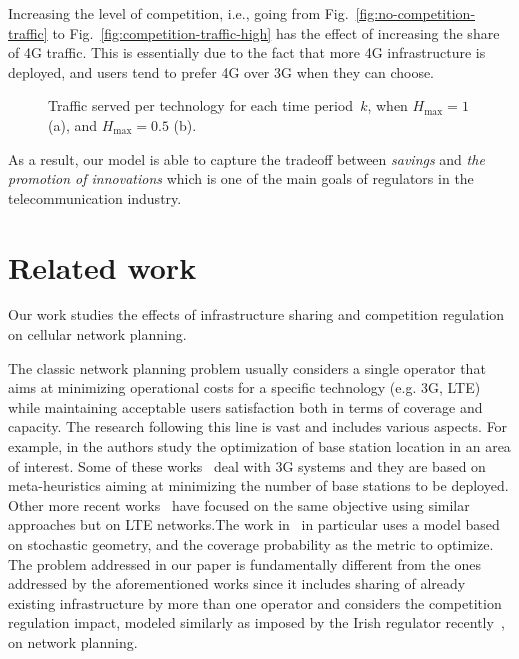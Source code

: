 \documentclass[10pt,journal,cspaper,compsoc]{IEEEtran}
\newcommand{\Fig}[1]{Fig.~\ref{fig:#1}}
\begin{document}
Increasing the level of competition, i.e., going from \Fig{no-competition-traffic}
to \Fig{competition-traffic-high} has the effect of increasing the share of 4G traffic.
This is essentially due to the fact that more 4G infrastructure is deployed, and users tend
to prefer 4G over 3G when they can choose.

\begin{figure*}
\centering
{}
\label{fig:competition-traffic}
\caption{Traffic served per technology for each time period~$k$, when $H_{\max}=1$ (a), and $H_{\max}=0.5$ (b).}
\end{figure*}

As a result, our model is able to capture the tradeoff between \emph{savings} and \emph{the promotion of innovations} which is one of the main goals of regulators in the telecommunication industry. 

\section{Related work}
\label{sec:related}

Our work studies the effects of infrastructure sharing and competition regulation on cellular network planning.

The classic network planning problem usually considers a single operator that aims at minimizing 
operational costs for a specific technology (e.g. 3G, LTE)
while maintaining acceptable users satisfaction both in terms of coverage and capacity.
The research following this line is vast and includes various aspects. For example, in 
\cite{amaldi2003,lee2000,khalek2011,shangyun2010,gordejuela2009,guo2013,ghazzai2015} the authors study the 
optimization of base station location in an area of interest.
Some of these works~\cite{amaldi2003,lee2000,khalek2011,shangyun2010} deal with 3G systems and they
are based on meta-heuristics aiming at minimizing the number of base stations to be deployed. Other 
more recent works~\cite{gordejuela2009,guo2013,ghazzai2015} have focused on the same objective using similar 
approaches but on LTE networks.The work in~\cite{guo2013} in particular uses a model based on stochastic geometry, 
and the coverage probability as the metric to optimize.
The problem addressed in our paper is fundamentally different from the ones addressed by the aforementioned works 
since it includes sharing of already existing infrastructure by more than one operator and considers 
the competition regulation impact, modeled similarly as imposed by the Irish regulator recently~\cite{vodafone-merger}, on network planning.
\end{document}
